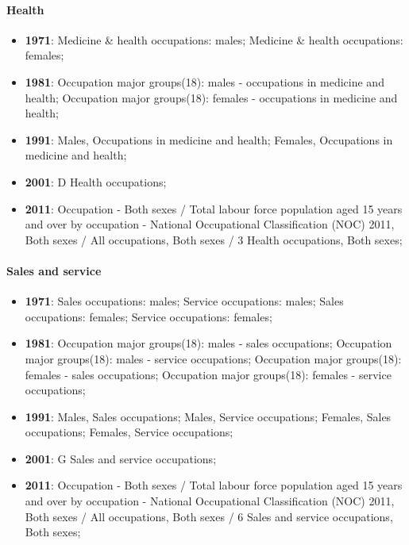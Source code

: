 \documentclass[a4paper]{article}
\begin{document}
\paragraph{Health}
\begin{itemize}
   \item{\textbf{1971}:  Medicine \& health occupations: males; Medicine \& health occupations: females;}
   \item{\textbf{1981}:  Occupation major groups(18): males - occupations in medicine and health; Occupation major groups(18): females - occupations in medicine and health;}
   \item{\textbf{1991}:  Males, Occupations in medicine and health; Females, Occupations in medicine and health;}
   \item{\textbf{2001}:  D Health occupations;}
   \item{\textbf{2011}:  Occupation - Both sexes / Total labour force population aged 15 years and over by occupation - National Occupational Classification (NOC) 2011, Both sexes / All occupations, Both sexes / 3 Health occupations, Both sexes;}
\end{itemize}

\paragraph{Sales and service}
\begin{itemize}
   \item{\textbf{1971}:  Sales occupations: males; Service occupations: males; Sales occupations: females; Service occupations: females;}
   \item{\textbf{1981}:  Occupation major groups(18): males - sales occupations; Occupation major groups(18): males - service occupations; Occupation major groups(18): females - sales occupations; Occupation major groups(18): females - service occupations;}
   \item{\textbf{1991}:  Males, Sales occupations; Males, Service occupations; Females, Sales occupations; Females, Service occupations;}
   \item{\textbf{2001}:  G Sales and service occupations;}
   \item{\textbf{2011}:  Occupation - Both sexes / Total labour force population aged 15 years and over by occupation - National Occupational Classification (NOC) 2011, Both sexes / All occupations, Both sexes / 6 Sales and service occupations, Both sexes;}
\end{itemize}
\end{document}
